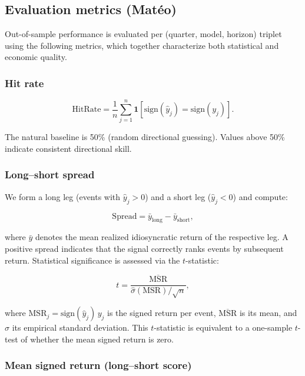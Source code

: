 \documentclass{article}
\begin{document}
\subsection{Evaluation metrics (Matéo)}
\label{sec:metrics}

Out-of-sample performance is evaluated per (quarter, model, horizon) triplet using the following metrics, which together characterize both statistical and economic quality.

\subsubsection{Hit rate}

\begin{equation}
\mathrm{HitRate} = \frac{1}{n} \sum_{j=1}^{n} \mathbf{1}\!\left[\mathrm{sign}(\hat{y}_j) = \mathrm{sign}(y_j)\right].
\end{equation}

The natural baseline is 50\% (random directional guessing). Values above 50\% indicate consistent directional skill.

\subsubsection{Long--short spread}

We form a long leg (events with $\hat{y}_j > 0$) and a short leg ($\hat{y}_j < 0$) and compute:

\begin{equation}
\mathrm{Spread} = \bar{y}_{\mathrm{long}} - \bar{y}_{\mathrm{short}},
\end{equation}

where $\bar{y}$ denotes the mean realized idiosyncratic return of the respective leg. A positive spread indicates that the signal correctly ranks events by subsequent return. Statistical significance is assessed via the $t$-statistic:

\begin{equation}
t = \frac{\overline{\mathrm{MSR}}}{\widehat{\sigma}(\mathrm{MSR})/\sqrt{n}},
\end{equation}

where $\mathrm{MSR}_j = \mathrm{sign}(\hat{y}_j)\, y_j$ is the signed return per event, $\overline{\mathrm{MSR}}$ is its mean, and $\widehat{\sigma}$ its empirical standard deviation. This $t$-statistic is equivalent to a one-sample $t$-test of whether the mean signed return is zero.

\subsubsection{Mean signed return (long--short score)}
\end{document}
